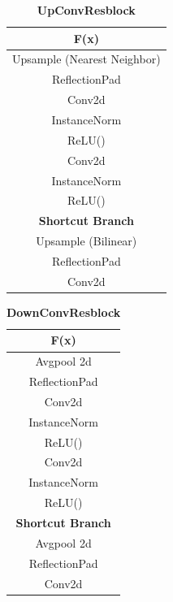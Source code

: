 \begin{table}
        \centering %
        \begin{tabular}{c} %
        \toprule %
        \textbf{F(x)}\\%
        \midrule %
        Upsample (Nearest Neighbor) \\
        ReflectionPad \\
        Conv2d \\
        InstanceNorm\\ %
        ReLU() \\
        Conv2d \\
        InstanceNorm\\ %
        ReLU() \\
        \midrule %
        \textbf{Shortcut Branch}\\
        \midrule %
        Upsample (Bilinear) \\
        ReflectionPad\\
        Conv2d \\
        \bottomrule %
        \end{tabular}
        \caption{        \label{table:upconvresblock} \textbf{UpConvResblock}} %
\end{table}

\begin{table}
        \centering %
        \begin{tabular}{c} %
        \toprule %
        \textbf{F(x)}\\%
        \midrule
        Avgpool 2d \\
        ReflectionPad \\
        Conv2d \\
        InstanceNorm\\ %
        ReLU() \\
        Conv2d \\
        InstanceNorm\\ %
        ReLU() \\
        \midrule%
        \textbf{Shortcut Branch}\\
        \midrule %
        Avgpool 2d \\
        ReflectionPad\\
        Conv2d \\
        \bottomrule%
        \end{tabular}
        \caption{\label{table:downconvresblock} \textbf{DownConvResblock}} 
\end{table}


